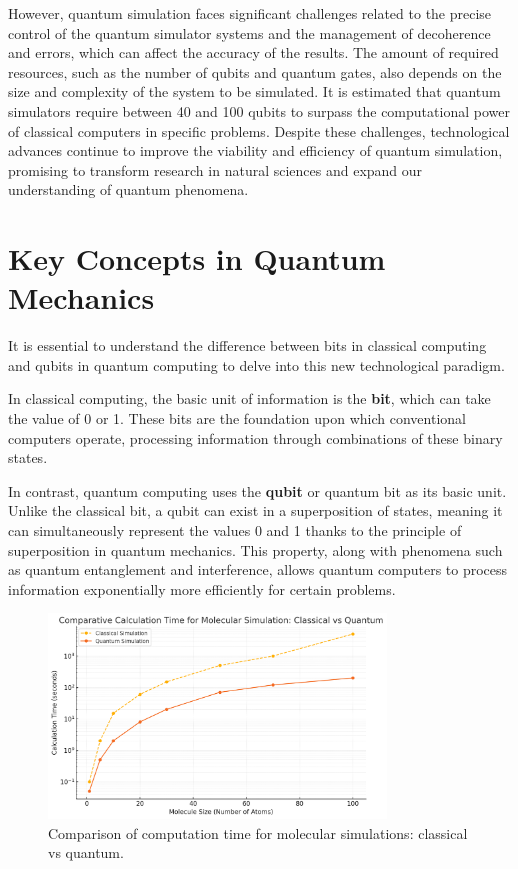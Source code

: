 However, quantum simulation faces significant challenges related to the precise control of the quantum simulator systems and the management of decoherence and errors, which can affect the accuracy of the results. The amount of required resources, such as the number of qubits and quantum gates, also depends on the size and complexity of the system to be simulated. It is estimated that quantum simulators require between 40 and 100 qubits to surpass the computational power of classical computers in specific problems. Despite these challenges, technological advances continue to improve the viability and efficiency of quantum simulation, promising to transform research in natural sciences and expand our understanding of quantum phenomena.

\section{Key Concepts in Quantum Mechanics}

It is essential to understand the difference between bits in classical computing and qubits in quantum computing to delve into this new technological paradigm.

In classical computing, the basic unit of information is the \textbf{bit}, which can take the value of 0 or 1. These bits are the foundation upon which conventional computers operate, processing information through combinations of these binary states.

In contrast, quantum computing uses the \textbf{qubit} or quantum bit as its basic unit. Unlike the classical bit, a qubit can exist in a superposition of states, meaning it can simultaneously represent the values 0 and 1 thanks to the principle of superposition in quantum mechanics. This property, along with phenomena such as quantum entanglement and interference, allows quantum computers to process information exponentially more efficiently for certain problems.

\begin{figure}[H]
    \centering
    \includegraphics[width=0.8\textwidth]{img/bit_vs_qbit.png}
    \caption{Comparison of computation time for molecular simulations: classical vs quantum.}
    \label{fig:bit_vs_qubit}
\end{figure}

